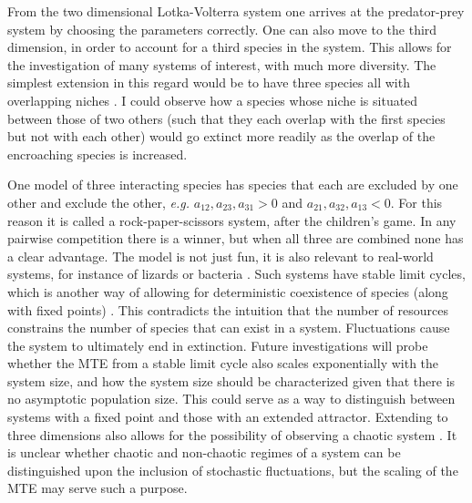 From the two dimensional Lotka-Volterra system one arrives at the predator-prey system by choosing the parameters correctly. 
One can also move to the third dimension, in order to account for a third species in the system. 
This allows for the investigation of many systems of interest, with much more diversity. 
The simplest extension in this regard would be to have three species all with overlapping niches \cite{MacArthur1970}. 
I could observe how a species whose niche is situated between those of two others (such that they each overlap with the first species but not with each other) would go extinct more readily as the overlap of the encroaching species is increased. 

One model of three interacting species has species that each are excluded by one other and exclude the other, \emph{e.g.} $a_{12},a_{23},a_{31}>0$ and $a_{21},a_{32},a_{13}<0$.  
For this reason it is called a rock-paper-scissors system, after the children's game. 
In any pairwise competition there is a winner, but when all three are combined none has a clear advantage. 
The model is not just fun, it is also relevant to real-world systems, for instance of lizards or bacteria \cite{Kerr2002,Kirkup2004,Berr2009}. 
Such systems have stable limit cycles, which is another way of allowing for deterministic coexistence of species (along with fixed points) \cite{Smale1976,Armstrong1976}. %
This contradicts the intuition that the number of resources constrains the number of species that can exist in a system. 
Fluctuations cause the system to ultimately end in extinction. 
Future investigations will probe whether the MTE from a stable limit cycle also scales exponentially with the system size, and how the system size should be characterized given that there is no asymptotic population size. 
%
This could serve as a way to distinguish between systems with a fixed point and those with an extended attractor. 
Extending to three dimensions also allows for the possibility of observing a chaotic system \cite{Strogatz1994}. 
It is unclear whether chaotic and non-chaotic regimes of a system can be distinguished upon the inclusion of stochastic fluctuations, but the scaling of the MTE may serve such a purpose. 

